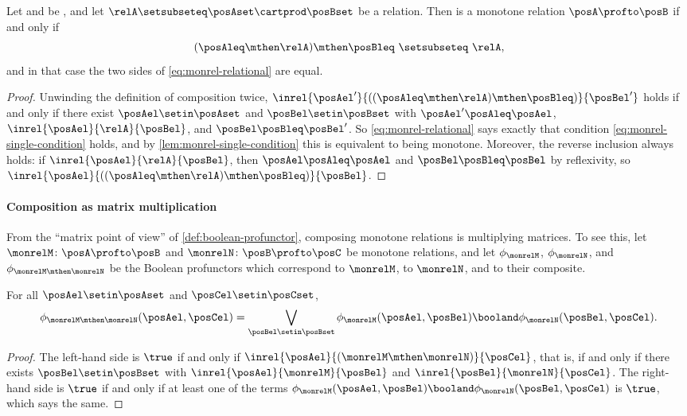 \begin{lemma}
    \label{lem:monrel-relational}
    Let \posA and \posB be , and let $\relA \setsubseteq \posAset \cartprod \posBset$ be a relation.
    Then \relA is a monotone relation $\posA \profto \posB$ if and only if
    \begin{equation}\label{eq:monrel-relational}
        (\posAleq \mthen \relA) \mthen \posBleq \ \setsubseteq\ \relA,
    \end{equation}
    and in that case the two sides of \cref{eq:monrel-relational} are equal.
\end{lemma}
\begin{proof}
    Unwinding the definition of composition twice, $\inrel{\posAel'}{((\posAleq \mthen \relA) \mthen \posBleq)}{\posBel'}$ holds if and only if there exist $\posAel \setin \posAset$ and $\posBel \setin \posBset$ with $\posAel' \posAleq \posAel$, $\inrel{\posAel}{\relA}{\posBel}$, and $\posBel \posBleq \posBel'$.
    So \cref{eq:monrel-relational} says exactly that condition \cref{eq:monrel-single-condition} holds, and by \cref{lem:monrel-single-condition} this is equivalent to \relA being monotone.
    Moreover, the reverse inclusion always holds: if $\inrel{\posAel}{\relA}{\posBel}$, then $\posAel \posAleq \posAel$ and $\posBel \posBleq \posBel$ by reflexivity, so $\inrel{\posAel}{((\posAleq \mthen \relA) \mthen \posBleq)}{\posBel}$.
\end{proof}

\paragraph{Composition as matrix multiplication}
\label{sec:monrel-composition-matrix}
From the ``matrix point of view'' of \cref{def:boolean-profunctor}, composing monotone relations is multiplying matrices.
To see this, let $\monrelM \colon \posA \profto \posB$ and $\monrelN \colon \posB \profto \posC$ be monotone relations, and let $\phi_{\monrelM}$, $\phi_{\monrelN}$, and $\phi_{\monrelM \mthen \monrelN}$ be the Boolean profunctors which correspond to $\monrelM$, to $\monrelN$, and to their composite.

\begin{lemma}
    \label{lem:boolprof-composition-matrix}
    For all $\posAel \setin \posAset$ and $\posCel \setin \posCset$,
    \begin{equation}
        \label{eq:boolprof-composition}
        \phi_{\monrelM \mthen \monrelN}(\posAel, \posCel)
        =
        \bigvee_{\posBel \setin \posBset}
        \phi_{\monrelM}(\posAel, \posBel) \booland \phi_{\monrelN}(\posBel, \posCel).
    \end{equation}
\end{lemma}
\begin{proof}
    The left-hand side is $\true$ if and only if $\inrel{\posAel}{(\monrelM \mthen \monrelN)}{\posCel}$, that is, if and only if there exists $\posBel \setin \posBset$ with $\inrel{\posAel}{\monrelM}{\posBel}$ and $\inrel{\posBel}{\monrelN}{\posCel}$.
    The right-hand side is $\true$ if and only if at least one of the terms $\phi_{\monrelM}(\posAel, \posBel) \booland \phi_{\monrelN}(\posBel, \posCel)$ is $\true$, which says the same.
\end{proof}

